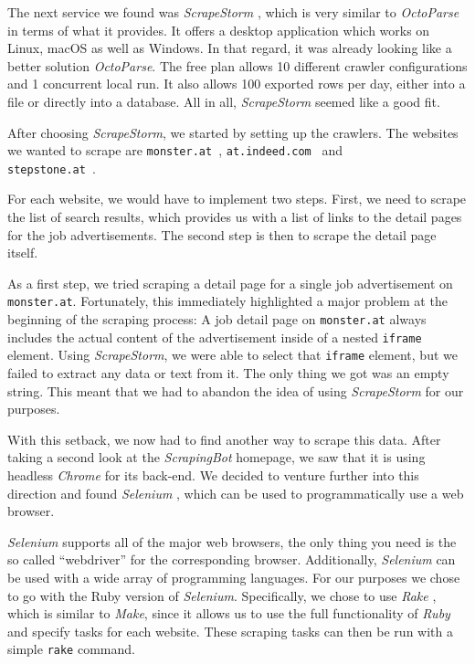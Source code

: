 \documentclass[runningheads]{llncs}
\begin{document}
The next service we found was \textit{ScrapeStorm} \cite{scrapestorm}, which is very similar to \textit{OctoParse} in terms of what it provides. It offers a desktop application which works on Linux, macOS as well as Windows. In that regard, it was already looking like a better solution \textit{OctoParse}. The free plan allows 10 different crawler configurations and 1 concurrent local run. It also allows 100 exported rows per day, either into a file or directly into a database. All in all, \textit{ScrapeStorm} seemed like a good fit.

After choosing \textit{ScrapeStorm}, we started by setting up the crawlers. The websites we wanted to scrape are \texttt{monster.at}~\cite{monster}, \texttt{at.indeed.com}~\cite{indeed} and \\ \texttt{stepstone.at}~\cite{stepstone}.

For each website, we would have to implement two steps. First, we need to scrape the list of search results, which provides us with a list of links to the detail pages for the job advertisements. The second step is then to scrape the detail page itself.

As a first step, we tried scraping a detail page for a single job advertisement on \texttt{monster.at}. Fortunately, this immediately highlighted a major problem at the beginning of the scraping process: A job detail page on \texttt{monster.at} always includes the actual content of the advertisement inside of a nested \texttt{iframe} element. Using \textit{ScrapeStorm}, we were able to select that \texttt{iframe} element, but we failed to extract any data or text from it. The only thing we got was an empty string. This meant that we had to abandon the idea of using \textit{ScrapeStorm} for our purposes.

With this setback, we now had to find another way to scrape this data. After taking a second look at the \textit{ScrapingBot} homepage, we saw that it is using headless \textit{Chrome} for its back-end. We decided to venture further into this direction and found \textit{Selenium} \cite{selenium}, which can be used to programmatically use a web browser.

\textit{Selenium} supports all of the major web browsers, the only thing you need is the so called “webdriver” for the corresponding browser. Additionally, \textit{Selenium} can be used with a wide array of programming languages. For our purposes we chose to go with the Ruby version of \textit{Selenium}. Specifically, we chose to use \textit{Rake} \cite{rake}, which is similar to \textit{Make}, since it allows us to use the full functionality of \textit{Ruby} \cite{ruby} and specify tasks for each website. These scraping tasks can then be run with a simple \texttt{rake} command.
\end{document}
